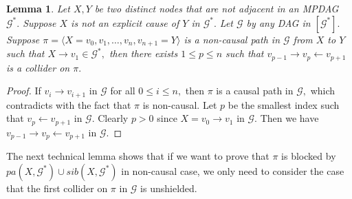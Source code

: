 \documentclass{article}
\newtheorem{lemma}{Lemma}
\begin{document}
\begin{lemma}
\label{lemma:explicit oin has collider}
Let $X,Y$ be two distinct nodes that are not adjacent in an MPDAG $\mathcal{G}^*.$ Suppose $X$ is not an explicit cause of $Y$ in $\mathcal{G}^*.$ Let $\mathcal{G}$ by any DAG in $[\mathcal{G}^*].$ Suppose $\pi=\langle X=v_0,v_1,\dots,v_n,v_{n+1}=Y\rangle$ is a non-causal path in $\mathcal{G}$ from $X$ to $Y$ such that $X\to v_1\in \mathcal{G}^*,$ then there exists $1\le p \le n$ such that $v_{p-1}\to v_p\leftarrow v_{p+1}$ is a collider on $\pi.$
\end{lemma}
\begin{proof}
If $v_i\to v_{i+1}$ in $\mathcal{G}$ for all $0\le i\le n,$ then $\pi$ is a causal path in $\mathcal{G},$ which contradicts with the fact that $\pi$ is non-causal. Let $p$ be the smallest index such that $v_p \leftarrow v_{p+1}$ in $\mathcal{G}.$ Clearly $p>0$ since $X=v_0\to v_1$ in $\mathcal{G}.$ Then we have $v_{p-1}\to v_p\leftarrow v_{p+1}$ in $\mathcal{G}.$ 
\end{proof}

The next technical lemma shows that if we want to prove that $\pi$ is blocked by $pa(X,\mathcal{G}^*)\cup sib(X,\mathcal{G}^*)$ in non-causal case, we only need to consider the case that the first collider on $\pi$ in $\mathcal{G}$ is unshielded. 
\end{document}

